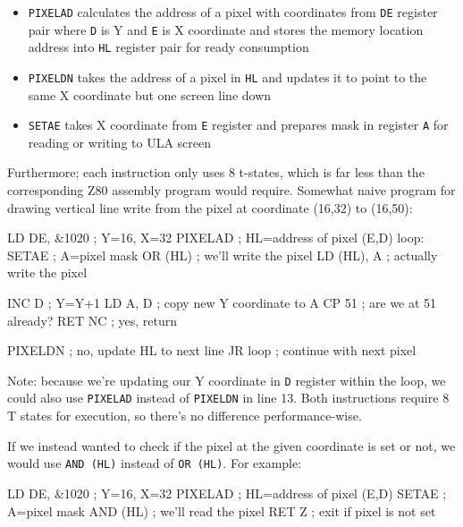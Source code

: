 \begin{itemize}[topsep=1pt,itemsep=1pt]
	\item {\tt PIXELAD} calculates the address of a pixel with coordinates from {\tt DE} register pair where {\tt D} is Y and {\tt E} is X coordinate and stores the memory location address into {\tt HL} register pair for ready consumption
	
	\item {\tt PIXELDN} takes the address of a pixel in {\tt HL} and updates it to point to the same X coordinate but one screen line down
	
	\item {\tt SETAE} takes X coordinate from {\tt E} register and prepares mask in register {\tt A} for reading or writing to ULA screen
\end{itemize}

Furthermore; each instruction only uses 8 t-states, which is far less than the corresponding Z80 assembly program would require. Somewhat naive program for drawing vertical line write from the pixel at coordinate (16,32) to (16,50):

\begin{tcblisting}{}
    LD DE, &1020      ; Y=16, X=32
    PIXELAD           ; HL=address of pixel (E,D)
loop:
    SETAE             ; A=pixel mask
    OR (HL)           ; we'll write the pixel
    LD (HL), A        ; actually write the pixel
    
    INC D             ; Y=Y+1
    LD A, D           ; copy new Y coordinate to A
    CP 51             ; are we at 51 already?
    RET NC            ; yes, return

    PIXELDN           ; no, update HL to next line
    JR loop           ; continue with next pixel
\end{tcblisting}

Note: because we're updating our Y coordinate in {\tt D} register within the loop, we could also use {\tt PIXELAD} instead of {\tt PIXELDN} in line 13. Both instructions require 8 T states for execution, so there's no difference performance-wise.

If we instead wanted to check if the pixel at the given coordinate is set or not, we would use {\tt AND (HL)} instead of {\tt OR (HL)}. For example:

\begin{tcblisting}{}
    LD DE, &1020      ; Y=16, X=32
    PIXELAD           ; HL=address of pixel (E,D)
    SETAE             ; A=pixel mask
    AND (HL)          ; we'll read the pixel
    RET Z             ; exit if pixel is not set
\end{tcblisting}


